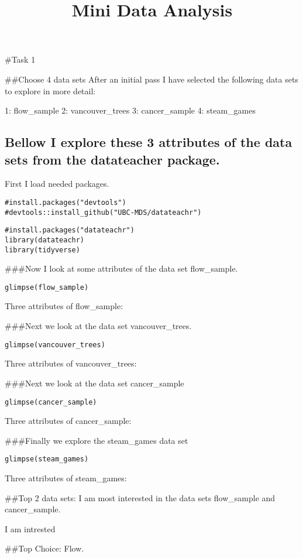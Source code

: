 \documentclass[
]{article}
\title{Mini Data Analysis}
\author{}
\date{\vspace{-2.5em}}
\begin{document}
\maketitle

\#Task 1

\#\#Choose 4 data sets After an initial pass I have selected the
following data sets to explore in more detail:

1: flow\_sample 2: vancouver\_trees 3: cancer\_sample 4: steam\_games

\hypertarget{bellow-i-explore-these-3-attributes-of-the-data-sets-from-the-datateacher-package.}{%
\subsection{Bellow I explore these 3 attributes of the data sets from
the datateacher
package.}\label{bellow-i-explore-these-3-attributes-of-the-data-sets-from-the-datateacher-package.}}

First I load needed packages.

\begin{verbatim}
#install.packages("devtools")
#devtools::install_github("UBC-MDS/datateachr")
\end{verbatim}

\begin{verbatim}
#install.packages("datateachr")
library(datateachr)
library(tidyverse)
\end{verbatim}

\#\#\#Now I look at some attributes of the data set flow\_sample.

\begin{verbatim}
glimpse(flow_sample)
\end{verbatim}

Three attributes of flow\_sample:

\#\#\#Next we look at the data set vancouver\_trees.

\begin{verbatim}
glimpse(vancouver_trees)
\end{verbatim}

Three attributes of vancouver\_trees:

\#\#\#Next we look at the data set cancer\_sample

\begin{verbatim}
glimpse(cancer_sample)
\end{verbatim}

Three attributes of cancer\_sample:

\#\#\#Finally we explore the steam\_games data set

\begin{verbatim}
glimpse(steam_games)
\end{verbatim}

Three attributes of steam\_games:

\#\#Top 2 data sets: I am most interested in the data sets flow\_sample
and cancer\_sample.

I am intrested

\#\#Top Choice: Flow.
\end{document}
